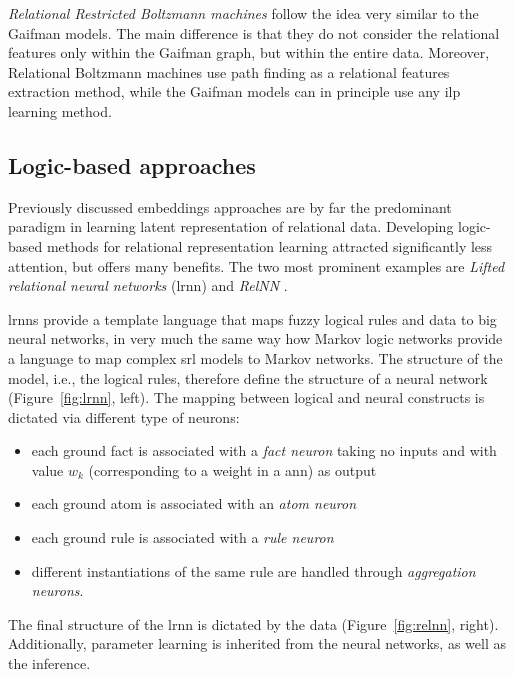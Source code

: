 \textit{Relational Restricted Boltzmann machines} follow the idea very similar to the Gaifman models.
The main difference is that they do not consider the relational features only within the Gaifman graph, but within the entire data.
Moreover, Relational Boltzmann machines use path finding as a relational features extraction method, while the Gaifman models can in principle use any \gls{ilp} learning method.






\subsection{Logic-based approaches}



Previously discussed embeddings approaches are by far the predominant paradigm in learning latent representation of relational data.
Developing logic-based methods for relational representation learning attracted significantly less attention, but offers many benefits.
The two most prominent examples are \textit{Lifted relational neural networks} (\gls{lrnn}) \cite{LRNN} and \textit{RelNN} \cite{Kazemi2018}.



\gls{lrnn}s provide a template language that maps  fuzzy logical rules and data to big neural networks, in very much the same way how Markov logic networks provide a language to map complex \gls{srl} models to Markov networks.
The structure of the model, i.e.,  the logical rules, therefore define the structure of a neural network (Figure~\ref{fig:lrnn}, left).
The mapping between logical and neural constructs is dictated via different type of neurons:
\begin{itemize}
	\item each ground fact is associated with a \textit{fact neuron} taking no inputs and with value $w_k$ (corresponding to a weight in a \gls{ann}) as output
	\item each ground atom is associated with an \textit{atom neuron}
	\item each ground rule is associated with a \textit{rule neuron}
	\item different instantiations of the same rule are handled through \textit{aggregation neurons}.
\end{itemize}
The final structure of the \gls{lrnn} is dictated by the data (Figure~\ref{fig:relnn}, right).
Additionally, parameter learning is inherited from the neural networks, as well as the inference.


